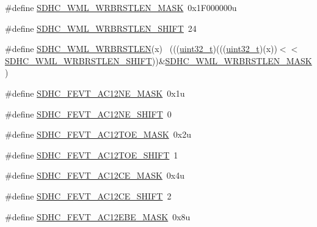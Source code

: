 \begin{DoxyCompactItemize}
\item 
\#define \hyperlink{group___s_d_h_c___register___masks_ga8a1713e8f594e5db7e84383d1839016d}{S\+D\+H\+C\+\_\+\+W\+M\+L\+\_\+\+W\+R\+B\+R\+S\+T\+L\+E\+N\+\_\+\+M\+A\+SK}~0x1\+F000000u
\item 
\#define \hyperlink{group___s_d_h_c___register___masks_ga347cd30bde44d964ab4ad25a8d17c9e6}{S\+D\+H\+C\+\_\+\+W\+M\+L\+\_\+\+W\+R\+B\+R\+S\+T\+L\+E\+N\+\_\+\+S\+H\+I\+FT}~24
\item 
\#define \hyperlink{group___s_d_h_c___register___masks_ga1d7257ad3e23003869a0d1f318392625}{S\+D\+H\+C\+\_\+\+W\+M\+L\+\_\+\+W\+R\+B\+R\+S\+T\+L\+EN}(x)                                    ~(((\hyperlink{_p_e___types_8h_a33594304e786b158f3fb30289278f5af}{uint32\+\_\+t})(((\hyperlink{_p_e___types_8h_a33594304e786b158f3fb30289278f5af}{uint32\+\_\+t})(x))$<$$<$\hyperlink{group___s_d_h_c___register___masks_ga347cd30bde44d964ab4ad25a8d17c9e6}{S\+D\+H\+C\+\_\+\+W\+M\+L\+\_\+\+W\+R\+B\+R\+S\+T\+L\+E\+N\+\_\+\+S\+H\+I\+FT}))\&\hyperlink{group___s_d_h_c___register___masks_ga8a1713e8f594e5db7e84383d1839016d}{S\+D\+H\+C\+\_\+\+W\+M\+L\+\_\+\+W\+R\+B\+R\+S\+T\+L\+E\+N\+\_\+\+M\+A\+SK})
\item 
\#define \hyperlink{group___s_d_h_c___register___masks_ga9f03ca4771ba7ba7dd17652cc0b3523f}{S\+D\+H\+C\+\_\+\+F\+E\+V\+T\+\_\+\+A\+C12\+N\+E\+\_\+\+M\+A\+SK}~0x1u
\item 
\#define \hyperlink{group___s_d_h_c___register___masks_gaaa25d15ca9ece7802c84eaabfcb610a3}{S\+D\+H\+C\+\_\+\+F\+E\+V\+T\+\_\+\+A\+C12\+N\+E\+\_\+\+S\+H\+I\+FT}~0
\item 
\#define \hyperlink{group___s_d_h_c___register___masks_ga08461177de9d00d32471a042648a0d67}{S\+D\+H\+C\+\_\+\+F\+E\+V\+T\+\_\+\+A\+C12\+T\+O\+E\+\_\+\+M\+A\+SK}~0x2u
\item 
\#define \hyperlink{group___s_d_h_c___register___masks_ga655231f1f3f9422f32cf26cfdb56b7d2}{S\+D\+H\+C\+\_\+\+F\+E\+V\+T\+\_\+\+A\+C12\+T\+O\+E\+\_\+\+S\+H\+I\+FT}~1
\item 
\#define \hyperlink{group___s_d_h_c___register___masks_gabbde9b3a4bf7a5ba098a8793459a93e3}{S\+D\+H\+C\+\_\+\+F\+E\+V\+T\+\_\+\+A\+C12\+C\+E\+\_\+\+M\+A\+SK}~0x4u
\item 
\#define \hyperlink{group___s_d_h_c___register___masks_ga6765ca9b4ffb1bf49aa914593c6d6476}{S\+D\+H\+C\+\_\+\+F\+E\+V\+T\+\_\+\+A\+C12\+C\+E\+\_\+\+S\+H\+I\+FT}~2
\item 
\#define \hyperlink{group___s_d_h_c___register___masks_gaf9bf81ce7359d8baeaa6da8d311a17df}{S\+D\+H\+C\+\_\+\+F\+E\+V\+T\+\_\+\+A\+C12\+E\+B\+E\+\_\+\+M\+A\+SK}~0x8u
$$
\end{DoxyCompactItemize}
